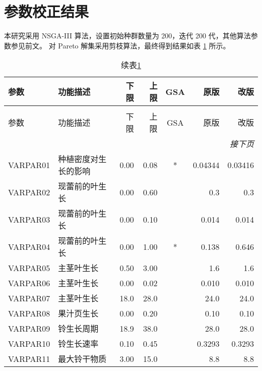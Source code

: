 \section{参数校正结果}
本研究采用 NSGA-III 算法，设置初始种群数量为 200，迭代 200 代，其他算法参数参见前文。%
对 Pareto 解集采用剪枝算法，最终得到结果如表 \ref{tab:parameters} 所示。
\begin{longtable}{llrrcrr}
    \caption{Cotton2K 参数列表及率定值}\label{tab:parameters}                         \\
    \toprule
    参数     & 功能描述                   & 下限   & 上限   & GSA & 原版    & 改版    \\
    \midrule\endfirsthead
    \caption*{续表\ref{tab:parameters}}                                               \\
    \toprule
    参数     & 功能描述                   & 下限   & 上限   & GSA & 原版    & 改版    \\
    \midrule
    \endhead
    \bottomrule
    \multicolumn{7}{r}{\textit{接下页}}                                               \\
    \endfoot
    \bottomrule
    \endlastfoot
    VARPAR01 & 种植密度对生长的影响       & 0.00   & 0.08   & *   & 0.04344 & 0.03416 \\
    VARPAR02 & 现蕾前的叶生长             & 0.00   & 0.60   &     & 0.3     & 0.3     \\
    VARPAR03 & 现蕾前的叶生长             & 0.00   & 0.10   &     & 0.014   & 0.014   \\
    VARPAR04 & 现蕾前的叶生长             & 0.00   & 1.00   & *   & 0.138   & 0.646   \\
    VARPAR05 & 主茎叶生长                 & 0.50   & 3.00   &     & 1.6     & 1.6     \\
    VARPAR06 & 主茎叶生长                 & 0.00   & 0.02   &     & 0.010   & 0.010   \\
    VARPAR07 & 主茎叶生长                 & 18.0   & 28.0   &     & 24.0    & 24.0    \\
    VARPAR08 & 果汁页生长                 & 0.00   & 0.20   &     & 0.10    & 0.10    \\
    VARPAR09 & 铃生长周期                 & 18.9   & 38.0   &     & 28.0    & 28.0    \\
    VARPAR10 & 铃生长速率                 & 0.10   & 0.45   &     & 0.3293  & 0.3293  \\
    VARPAR11 & 最大铃干物质               & 3.00   & 15.0   &     & 8.8     & 8.8     \\

\end{longtable}
